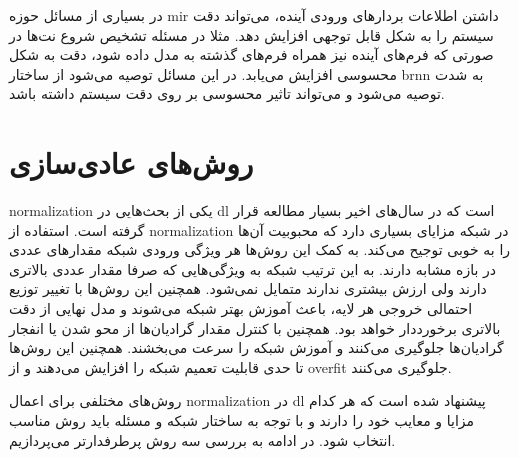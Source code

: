 در بسیاری از مسائل حوزه \gls{mir} داشتن اطلاعات بردارهای ورودی آینده، می‌تواند
دقت سیستم را به شکل قابل توجهی افزایش دهد. مثلا در مسئله تشخیص شروع نت‌ها در
صورتی که فرم‌های آینده نیز همراه فرم‌های گذشته به مدل داده شود، دقت به شکل
محسوسی افزایش می‌یابد. در این مسائل توصیه می‌شود از ساختار \gls{brnn} به شدت
توصیه می‌شود و می‌تواند تاثیر محسوسی بر روی دقت سیستم داشته باشد.

\section{روش‌های عادی‌سازی}
\gls{normalization} یکی از بحث‌هایی در \gls{dl} است که در سال‌های اخیر بسیار
مطالعه قرار گرفته است. استفاده از \gls{normalization} در شبکه مزایای بسیاری دارد
که محبوبیت آن‌ها را به خوبی توجیح می‌کند. به کمک این روش‌ها هر ویژگی ورودی شبکه
مقدارهای عددی در بازه مشابه دارند. به این ترتیب شبکه به ویژگی‌هایی که صرفا مقدار
عددی بالاتری دارند ولی ارزش بیشتری ندارند متمایل نمی‌شود. همچنین این روش‌ها با
تغییر توزیع احتمالی خروجی هر لایه، باعث آموزش بهتر شبکه می‌شوند و مدل نهایی از
دقت بالاتری برخورددار خواهد بود. همچنین با کنترل مقدار گرادیان‌ها از محو شدن یا
انفجار گرادیان‌ها جلوگیری می‌کنند و آموزش شبکه را سرعت می‌بخشند. همچنین این
روش‌ها تا حدی قابلیت تعمیم شبکه را افزایش می‌دهند و از \gls{overfit} جلوگیری
می‌کنند.

روش‌های مختلفی برای اعمال \gls{normalization} در \gls{dl} پیشنهاد شده است که هر
کدام مزایا و معایب خود را دارند و با توجه به ساختار شبکه و مسئله باید روش مناسب
انتخاب شود. در ادامه به بررسی سه روش پرطرفدارتر می‌پردازیم.


